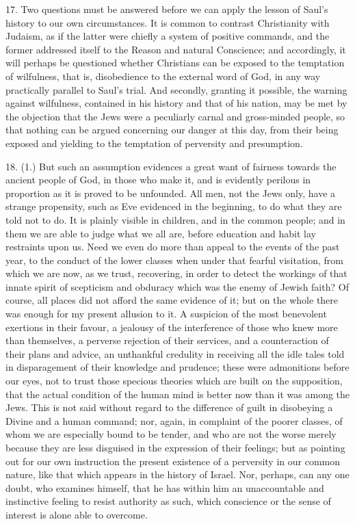 17. Two questions must be answered before we can apply the lesson
of Saul's history to our own circumstances. It is common to contrast
Christianity with Judaism, as if the latter were chiefly a system of
positive commands, and the former addressed itself to the Reason and
natural Conscience; and accordingly, it will perhaps be questioned
whether Christians can be exposed to the temptation of wilfulness,
that is, disobedience to the external word of God, in any way
practically parallel to Saul's trial. And secondly, granting it
possible, the warning against wilfulness, contained in his history and
that of his nation, may be met by the objection that the Jews were a
peculiarly carnal and gross-minded people, so that nothing can be
argued concerning our danger at this day, from their being exposed and
yielding to the temptation of perversity and presumption.

18. (1.) But such an assumption evidences a great want of fairness
towards the ancient people of God, in those who make it, and is
evidently perilous in proportion as it is proved to be unfounded. All
men, not the Jews only, have a strange propensity, such as Eve
evidenced in the beginning, to do what they are told not to do. It is
plainly visible in children, and in the common people; and in them we
are able to judge what we all are, before education and habit lay
restraints upon us. Need we even do more than appeal to the events of
the past year, to the conduct of the lower classes when under that
fearful visitation, from which we are now, as we trust, recovering, in
order to detect the workings of that innate spirit of scepticism and
obduracy which was the enemy of Jewish faith? Of course, all places
did not afford the same evidence of it; but on the whole there was
enough for my present allusion to it. A suspicion of the most
benevolent exertions in their favour, a jealousy of the interference
of those who knew more than themselves, a perverse rejection of their
services, and a counteraction of their plans and advice, an unthankful
credulity in receiving all the idle tales told in disparagement of
their knowledge and prudence; these were admonitions before our eyes,
not to trust those specious theories which are built on the
supposition, that the actual condition of the human mind is better now
than it was among the Jews. This is not said without regard to the
difference of guilt in disobeying a Divine and a human command; nor,
again, in complaint of the poorer classes, of whom we are especially
bound to be tender, and who are not the worse merely because they are
less disguised in the expression of their feelings; but as pointing
out for our own instruction the present existence of a perversity in
our common nature, like that which appears in the history of Israel.
Nor, perhaps, can any one doubt, who examines himself, that he has
within him an unaccountable and instinctive feeling to resist
authority as such, which conscience or the sense of interest is alone
able to overcome.

